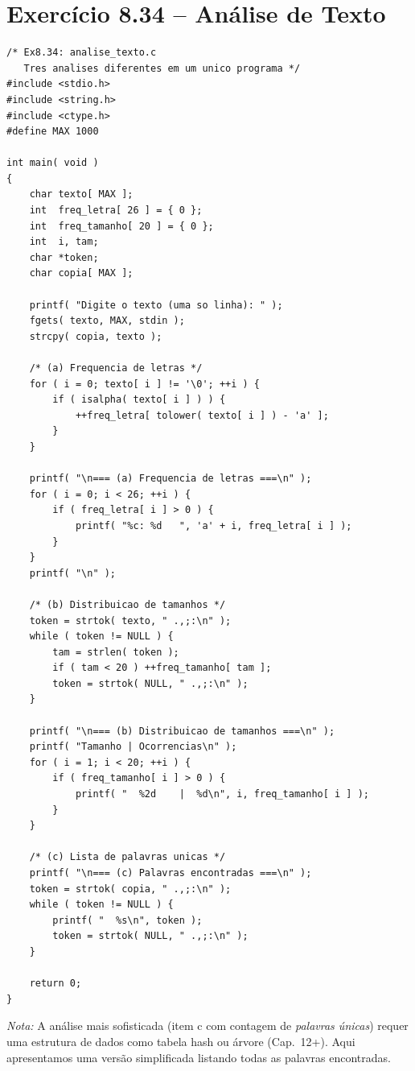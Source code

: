 \documentclass[12pt,a4paper]{article}
\begin{document}
\newpage

\section{Exercício 8.34 -- Análise de Texto}

\begin{respostabox}
\begin{lstlisting}
/* Ex8.34: analise_texto.c
   Tres analises diferentes em um unico programa */
#include <stdio.h>
#include <string.h>
#include <ctype.h>
#define MAX 1000

int main( void )
{
    char texto[ MAX ];
    int  freq_letra[ 26 ] = { 0 };
    int  freq_tamanho[ 20 ] = { 0 };
    int  i, tam;
    char *token;
    char copia[ MAX ];

    printf( "Digite o texto (uma so linha): " );
    fgets( texto, MAX, stdin );
    strcpy( copia, texto );

    /* (a) Frequencia de letras */
    for ( i = 0; texto[ i ] != '\0'; ++i ) {
        if ( isalpha( texto[ i ] ) ) {
            ++freq_letra[ tolower( texto[ i ] ) - 'a' ];
        }
    }

    printf( "\n=== (a) Frequencia de letras ===\n" );
    for ( i = 0; i < 26; ++i ) {
        if ( freq_letra[ i ] > 0 ) {
            printf( "%c: %d   ", 'a' + i, freq_letra[ i ] );
        }
    }
    printf( "\n" );

    /* (b) Distribuicao de tamanhos */
    token = strtok( texto, " .,;:\n" );
    while ( token != NULL ) {
        tam = strlen( token );
        if ( tam < 20 ) ++freq_tamanho[ tam ];
        token = strtok( NULL, " .,;:\n" );
    }

    printf( "\n=== (b) Distribuicao de tamanhos ===\n" );
    printf( "Tamanho | Ocorrencias\n" );
    for ( i = 1; i < 20; ++i ) {
        if ( freq_tamanho[ i ] > 0 ) {
            printf( "  %2d    |  %d\n", i, freq_tamanho[ i ] );
        }
    }

    /* (c) Lista de palavras unicas */
    printf( "\n=== (c) Palavras encontradas ===\n" );
    token = strtok( copia, " .,;:\n" );
    while ( token != NULL ) {
        printf( "  %s\n", token );
        token = strtok( NULL, " .,;:\n" );
    }

    return 0;
}
\end{lstlisting}

\textit{Nota:} A análise mais sofisticada (item c com contagem de \textit{palavras
únicas}) requer uma estrutura de dados como tabela hash ou árvore (Cap.~12+).
Aqui apresentamos uma versão simplificada listando todas as palavras encontradas.
\end{respostabox}
\end{document}
